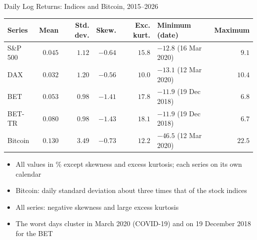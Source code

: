 \begin{frame}{Daily Log Returns: Indices and Bitcoin, 2015--2026}
\itemsize{\small}
\begin{center}
\footnotesize
\begin{tabular}{lrrrrlr}
\toprule
Series & Mean & Std. dev. & Skew. & Exc. kurt. & Minimum (date) & Maximum \\
\midrule
S\&P 500 & $0.045$ & $1.12$ & $-0.64$ & $15.8$ & $-12.8$ (16 Mar 2020) & $9.1$ \\
DAX & $0.032$ & $1.20$ & $-0.56$ & $10.0$ & $-13.1$ (12 Mar 2020) & $10.4$ \\
BET & $0.053$ & $0.98$ & $-1.41$ & $17.8$ & $-11.9$ (19 Dec 2018) & $6.8$ \\
BET-TR & $0.080$ & $0.98$ & $-1.43$ & $18.1$ & $-11.9$ (19 Dec 2018) & $6.7$ \\
Bitcoin & $0.130$ & $3.49$ & $-0.73$ & $12.2$ & $-46.5$ (12 Mar 2020) & $22.5$ \\
\bottomrule
\end{tabular}
\end{center}
\begin{itemize}
    \item All values in \% except skewness and excess kurtosis; each series on its own calendar
    \item Bitcoin: daily standard deviation about three times that of the stock indices
    \item All series: negative skewness and large excess kurtosis
    \item The worst days cluster in March 2020 (COVID-19) and on 19 December 2018 for the BET
\end{itemize}
\end{frame}

